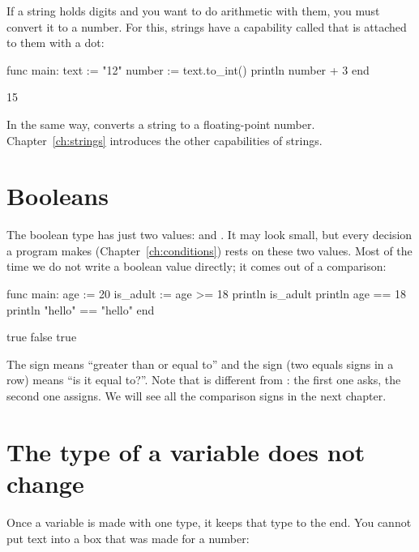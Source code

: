 If a string holds digits and you want to do arithmetic with them, you must
convert it to a number. For this, strings have a capability called
 that is attached to them with a dot:

\begin{salamcode}
func main:
    text := "12"
    number := text.to_int()
    println number + 3
end
\end{salamcode}

\begin{salamout}
15
\end{salamout}

In the same way,  converts a string to a floating-point
number. Chapter~\ref{ch:strings} introduces the other capabilities of
strings.

\section{Booleans}

The boolean type has just two values:  and . It may
look small, but every decision a program makes (Chapter~\ref{ch:conditions})
rests on these two values. Most of the time we do not write a boolean value
directly; it comes out of a comparison:

\begin{salamcode}
func main:
    age := 20
    is_adult := age >= 18
    println is_adult
    println age == 18
    println "hello" == "hello"
end
\end{salamcode}

\begin{salamout}
true
false
true
\end{salamout}

The sign \code{>=} means ``greater than or equal to'' and the sign
\code{==} (two equals signs in a row) means ``is it equal to?''. Note that
\code{==} is different from \code{=}: the first one asks, the second one
assigns. We will see all the comparison signs in the next chapter.

\section{The type of a variable does not change}

Once a variable is made with one type, it keeps that type to the end. You
cannot put text into a box that was made for a number:

